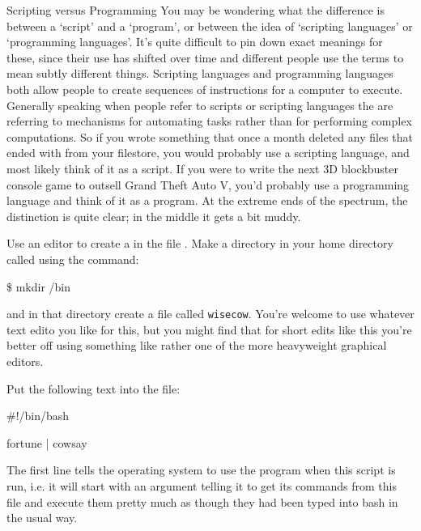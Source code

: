 \begin{diversion}{Scripting versus Programming}
You may be wondering what the difference is between a `script' and a `program', or between the idea of `scripting languages' or `programming languages'. It's quite difficult to pin down exact meanings for these, since their use has shifted over time and different people use the terms to mean subtly different things. Scripting languages and programming languages both allow people to create sequences of instructions for a computer to execute. Generally speaking when people refer to scripts or scripting languages the are referring to mechanisms for automating tasks rather than for performing complex computations. So if you wrote something that once a month deleted any files that ended with  from your filestore, you would probably use a scripting language, and most likely think of it as a script. If you were to write the next 3D blockbuster console game to outsell Grand Theft Auto V, you'd probably use a programming language and think of it as a program. At the extreme ends of the spectrum, the distinction is quite clear; in the middle it gets a bit muddy.
\end{diversion}


Use an editor to create a  in the file
. Make a directory in your home directory called  using the command:

\begin{ttoutenv}
\$ mkdir \tilde/bin
\end{ttoutenv}

and in that directory create a file called \texttt{wisecow}. You're welcome to use whatever text edito you like for this, but you might find that for short edits like this you're better off using something like  rather one of the more heavyweight graphical editors. 

Put the following text into the file:

\begin{ttoutenv}
#!/bin/bash

fortune | cowsay
\end{ttoutenv}

The first line tells the operating system to use the program 
when this script is run, i.e. it will start  with an argument
telling it to get its commands from this file and execute them pretty much as
though they had been typed into bash in the usual way.


